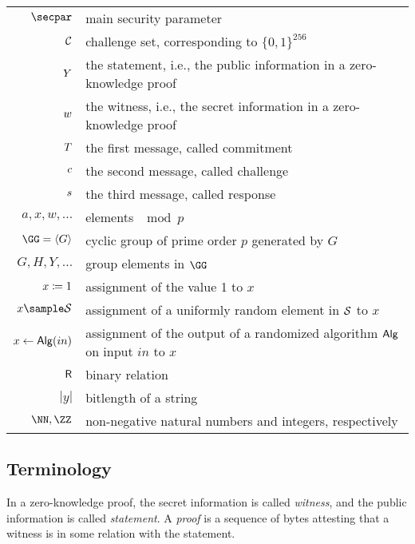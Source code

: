 \documentclass[11pt]{article}
\begin{document}
\begin{tabular}{r@{\hspace{1em}}p{13cm}}
    $\secpar$ & main security parameter\\
    $\mathcal{C}$ & challenge set, corresponding to $\{0,1\}^{256}$\\
    $Y$ & the statement, i.e., the public information in a zero-knowledge proof \\
    $w$ & the witness, i.e., the secret information in a zero-knowledge proof \\
    $T$ & the first message, called commitment \\
    $c$ & the second message, called challenge \\
    $s$ & the third message, called response \\
    $a, x, w, \dots$ & elements $\!\!\!\mod p$ \\
    $\GG = \langle G \rangle$ & cyclic group of prime order $p$ generated by $G$\\
    $G, H, Y, \dots$ & group elements in $\GG$ \\
    $x \coloneqq 1$ & assignment of the value 1 to $x$\\
    $x\sample\someset$ & assignment of a uniformly random element in $\mathcal{S}$ to $x$\\
    $x\gets\mathsf{Alg}(in)$ & assignment of the output of a randomized algorithm $\mathsf{Alg}$ on input $in$ to $x$\\
    $\mathsf{R}$ & binary relation\\
    $|y|$ & bitlength of a string\\
    $\NN,\ZZ$ & non-negative natural numbers and integers, respectively
\end{tabular}

\subsection{Terminology}

In a zero-knowledge proof, the secret information is called \emph{witness},
and the public information is called \emph{statement}. A \emph{proof} is a sequence of bytes attesting that a witness is in some relation with the statement.
\end{document}
